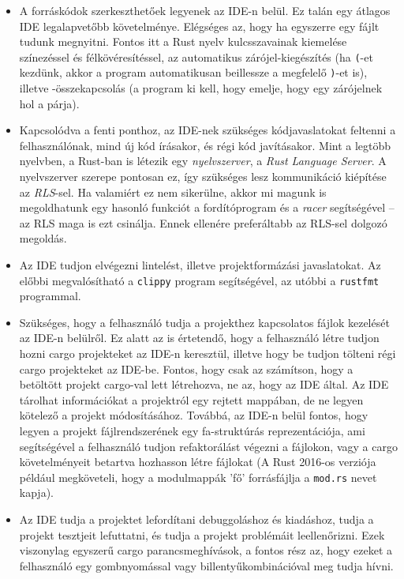 \begin{itemize}
	\item A forráskódok szerkeszthetőek legyenek az IDE-n belül. Ez talán egy átlagos IDE legalapvetőbb követelménye. 
	Elégséges az, hogy ha egyszerre egy fájlt tudunk megnyitni. 
	Fontos itt a Rust nyelv kulcsszavainak kiemelése színezéssel és félkövéresítéssel, az automatikus zárójel-kiegészítés (ha \texttt{(}-et kezdünk, akkor a program automatikusan beillessze a megfelelő \texttt{)}-et is), 
	illetve -összekapcsolás (a program ki kell, hogy emelje, hogy egy zárójelnek hol a párja).
	
	\item Kapcsolódva a fenti ponthoz, az IDE-nek szükséges kódjavaslatokat feltenni a felhasználónak, mind új kód írásakor, és régi kód javításakor. 
	Mint a legtöbb nyelvben, a Rust-ban is létezik egy \emph{nyelvszerver}, a \emph{Rust Language Server}\cite{rls}. 
	A nyelvszerver szerepe pontosan ez, így szükséges lesz kommunikáció kiépítése az \emph{RLS}-sel. 
	Ha valamiért ez nem sikerülne, akkor mi magunk is megoldhatunk egy hasonló funkciót a fordítóprogram és a \emph{racer}\cite{racer} segítségével -- 
	az RLS maga is ezt csinálja. Ennek ellenére preferáltabb az RLS-sel dolgozó megoldás.\label{rls}
	
	\item Az IDE tudjon elvégezni lintelést, illetve projektformázási javaslatokat. 
	Az előbbi megvalósítható a \texttt{clippy}\cite{clippy} program segítségével, az utóbbi a \texttt{rustfmt}\cite{rustfmt} programmal.
	
	\item Szükséges, hogy a felhasználó tudja a projekthez kapcsolatos fájlok kezelését az IDE-n belülről. 
	Ez alatt az is értetendő, hogy a felhasználó létre tudjon hozni cargo projekteket az IDE-n keresztül, illetve hogy be tudjon tölteni régi cargo projekteket az IDE-be. 
	Fontos, hogy csak az számítson, hogy a betöltött projekt cargo-val lett létrehozva, ne az, hogy az IDE által. 
	Az IDE tárolhat információkat a projektról egy rejtett mappában, de ne legyen kötelező a projekt módosításához. 
	Továbbá, az IDE-n belül fontos, hogy legyen a projekt fájlrendszerének egy fa-struktúrás reprezentációja, ami segítségével a felhasználó tudjon refaktorálást végezni a fájlokon, vagy a cargo követelményeit betartva hozhasson létre fájlokat 
	(A Rust 2016-os verziója például megköveteli, hogy a modulmappák 'fő' forrásfájlja a \texttt{mod.rs} nevet kapja).
	
	\item Az IDE tudja a projektet lefordítani debuggoláshoz és kiadáshoz, tudja a projekt tesztjeit lefuttatni, és tudja a projekt problémáit leellenőrizni. 
	Ezek viszonylag egyszerű cargo parancsmeghívások, a fontos rész az, hogy ezeket a felhasználó egy gombnyomással vagy billentyűkombinációval meg tudja hívni.
	

\end{itemize}

